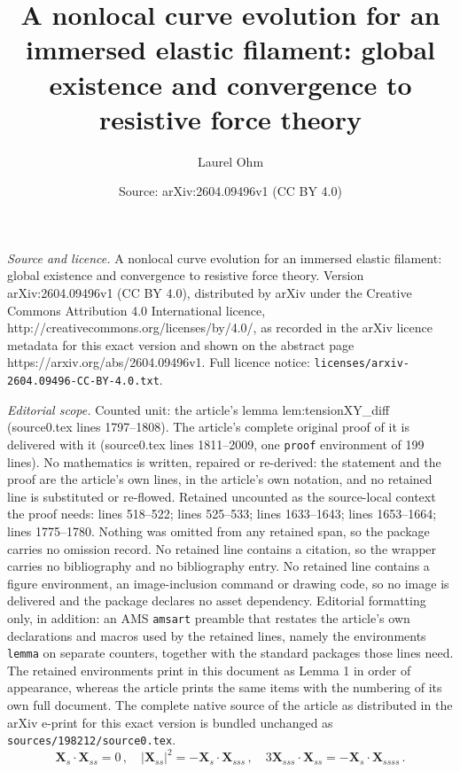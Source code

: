 \documentclass[10pt,a4paper]{amsart}
\title{A nonlocal curve evolution for an immersed elastic filament: global existence and convergence to resistive force theory}
\author{Laurel Ohm}
\date{Source: arXiv:2604.09496v1 (CC BY 4.0)}
\newcommand{\X}{\bm{X}}
\newcommand{\abs}[1]{\left\lvert #1 \right\rvert}
\begin{document}
\maketitle

\noindent\emph{Source and licence.} A nonlocal curve evolution for an immersed elastic filament: global existence and convergence to resistive force theory. Version arXiv:2604.09496v1 (CC BY 4.0), distributed by arXiv under the Creative Commons Attribution 4.0 International licence, http://creativecommons.org/licenses/by/4.0/, as recorded in the arXiv licence metadata for this exact version and shown on the abstract page https://arxiv.org/abs/2604.09496v1. Full licence notice: \texttt{licenses/arxiv-2604.09496-CC-BY-4.0.txt}.\par\smallskip

\noindent\textit{Editorial scope.} Counted unit: the article's lemma lem:tensionXY\_diff (source0.tex lines 1797--1808). The article's complete original proof of it is delivered with it (source0.tex lines 1811--2009, one \texttt{proof} environment of 199 lines). No mathematics is written, repaired or re-derived: the statement and the proof are the article's own lines, in the article's own notation, and no retained line is substituted or re-flowed.  Retained uncounted as the source-local context the proof needs: lines 518--522; lines 525--533; lines 1633--1643; lines 1653--1664; lines 1775--1780.  Nothing was omitted from any retained span, so the package carries no omission record.  No retained line contains a citation, so the wrapper carries no bibliography and no bibliography entry.  No retained line contains a figure environment, an image-inclusion command or drawing code, so no image is delivered and the package declares no asset dependency.  Editorial formatting only, in addition: an AMS \texttt{amsart} preamble that restates the article's own declarations and macros used by the retained lines, namely the environments \texttt{lemma} on separate counters, together with the standard packages those lines need.  The retained environments print in this document as Lemma 1 in order of appearance, whereas the article prints the same items with the numbering of its own full document.  The complete native source of the article as distributed in the arXiv e-print for this exact version is bundled unchanged as \texttt{sources/198212/source0.tex}.
\begin{equation}\label{eq:inex_ids}
  \X_s\cdot\X_{ss}=0\,, \quad 
  \abs{\X_{ss}}^2 =-\X_s\cdot\X_{sss}\,, \quad
  3\X_{sss}\cdot\X_{ss} = -\X_s\cdot\X_{ssss}\,.
\end{equation}
\end{document}
